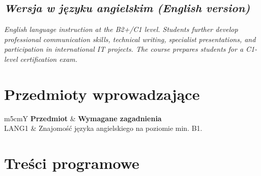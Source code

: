 \documentclass[12pt, a4paper]{article}
\newcommand{\thdrule}{\noalign{\global\setlength{\extrarowheight}{0pt}}}
\newcommand{\thdend}{\noalign{\global\setlength{\extrarowheight}{3pt}}}
\begin{document}
\subsection*{\textit{Wersja w języku angielskim (English version)}}

\textit{English language instruction at the B2+/C1 level. Students further develop professional communication skills, technical writing, specialist presentations, and participation in international IT projects. The course prepares students for a C1-level certification exam.}


\section{Przedmioty wprowadzające}

{\scriptsize
\begin{tabularx}{\textwidth}{m{5cm}Y}
\thdrule\toprule
{} {\color{white}\textbf{Przedmiot}} & {\color{white}\textbf{Wymagane zagadnienia}} \\
\midrule\thdend
   LANG1 & Znajomość języka angielskiego na poziomie min. B1. \\
\bottomrule
\end{tabularx}}

\section{Treści programowe}
\end{document}
